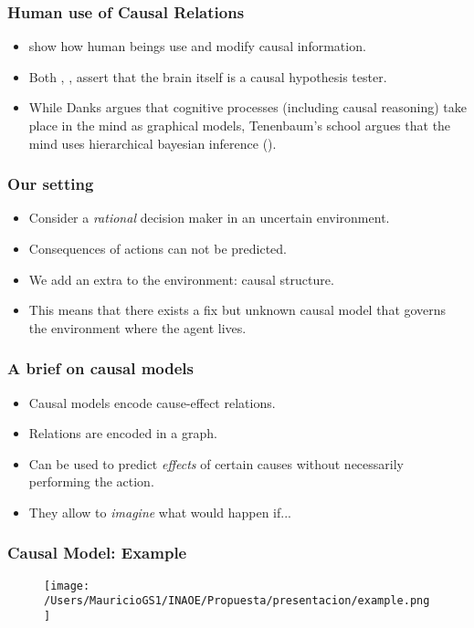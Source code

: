 \documentclass{beamer}
\theoremstyle{plain}
\begin{document}
\begin{frame}
\frametitle{Human use of Causal Relations}
\begin{itemize}
\item \cite{hagmayer2013repeated} show how human beings use and modify causal information.
\item Both \cite{hohwy2013predictive}, \cite{clark2015surfing}, assert that the brain itself is a causal hypothesis tester. 
\item While Danks \cite{danks2014unifying} argues that cognitive processes (including causal reasoning) take place in the mind as graphical models, Tenenbaum's school argues that the mind uses hierarchical bayesian inference (\cite{kemp2010learning}).
\end{itemize}
\end{frame}

\begin{frame}
\frametitle{Our setting}
\begin{itemize}
\item Consider a \textit{rational} decision maker in an uncertain environment.
\item Consequences of actions can not be predicted.
\item We add an extra to the environment: causal structure.
\item This means that there exists a fix but unknown causal model that governs the environment where the agent lives.
\end{itemize}
\end{frame}

\begin{frame}
\frametitle{A brief on causal models}
\begin{itemize}
\item Causal models encode cause-effect relations. 
\item Relations are encoded in a graph.
\item Can be used to predict \textit{effects} of certain causes without necessarily performing the action.
\item They allow to \textit{imagine} what would happen if...
\end{itemize}
\end{frame}

\begin{frame}
\frametitle{Causal Model: Example}
\begin{figure}[ht]
\vskip 0.2in
\begin{center}
\texttt{[image: /Users/MauricioGS1/INAOE/Propuesta/presentacion/example.png]}
\end{center}
\vskip -0.2in
\end{figure}
\end{frame}
\end{document}
